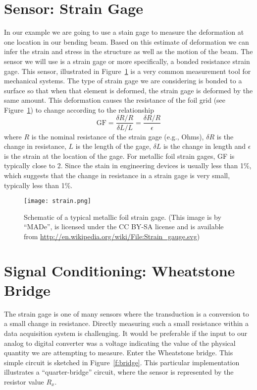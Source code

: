 \section{Sensor: Strain Gage}
In our example we are going to use a stain gage to measure the deformation at one location in our bending beam.  Based on this estimate of deformation we can infer the strain and stress in the structure as well as the motion of the beam.  The sensor we will use is a \gls{strain gage} or more specifically, a bonded resistance strain gage.  This sensor, illustrated in Figure~\ref{f:strain} is a very common measurement tool for mechanical systems.  The type of strain gage we are considering is bonded to a surface so that when that element is deformed, the strain gage is deformed by the same amount.  This deformation causes the resistance of the foil grid (see Figure~\ref{f:strain}) to change according to the relationship
\begin{equation}\label{e:gage}
\mathrm{GF} = \frac{\delta R / R}{\delta L / L}=\frac{\delta R /R}{\epsilon}
\end{equation}
where $R$ is the nominal resistance of the strain gage (e.g., \unit[120]{Ohms}), $\delta R$ is the change in resistance, $L$ is the length of the gage, $\delta L$ is the change in length and $\epsilon$ is the strain at the location of the gage.  For metallic foil strain gages, GF is typically close to 2.  Since the stain in engineering devices is usually less than 1\%, which suggests that the change in resistance in a strain gage is very small, typically less than 1\%.  

\begin{figure}[hb!]
\centerline{
{\texttt{[image: strain.png]}}}
\caption{Schematic of a typical metallic foil strain gage.  (This image is by ``MADe'', is licensed under the CC BY-SA license and is available from \url{http://en.wikipedia.org/wiki/File:Strain_gauge.svg}) }
\label{f:strain}
\end{figure}


\section{Signal Conditioning: Wheatstone Bridge}
The strain gage is one of many sensors where the transduction is a conversion to a small change in resistance.  Directly measuring such a small resistance within a data acquisition system is challenging.  It would be preferable if the input to our analog to digital converter was a voltage indicating the value of the physical quantity we are attempting to measure.  Enter the Wheatstone bridge.  This simple circuit is sketched in Figure~\ref{f:bridge}.  This particular implementation illustrates a ``quarter-bridge'' circuit, where the sensor is represented by the resistor value $R_x$.

